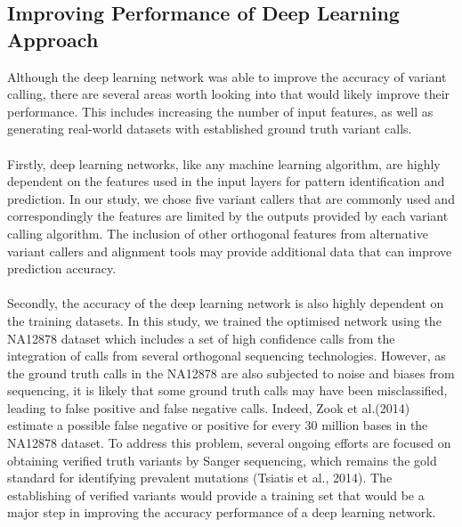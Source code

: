 \documentclass{article}
\begin{document}
\subsection{Improving Performance of Deep Learning Approach}

Although the deep learning network was able to improve the accuracy of variant calling, there are several areas worth looking into that would likely improve their performance. This includes increasing the number of input features, as well as generating real-world datasets with established ground truth variant calls.\\\\
Firstly, deep learning networks, like any machine learning algorithm, are highly dependent on the features used in the input layers for pattern identification and prediction. In our study, we chose five variant callers that are commonly used and correspondingly the features are limited by the outputs provided by each variant calling algorithm. The inclusion of other orthogonal features from alternative variant callers and alignment tools may provide additional data that can improve prediction accuracy.\\\\
Secondly, the accuracy of the deep learning network is also highly dependent on the training datasets. In this study, we trained the optimised network using the NA12878 dataset which includes a set of high confidence calls from the integration of calls from several orthogonal sequencing technologies. However, as the ground truth calls in the NA12878 are also subjected to noise and biases from sequencing, it is likely that some ground truth calls may have been misclassified, leading to false positive and false negative calls. Indeed, Zook et al.(2014) estimate a possible false negative or positive for every 30 million bases in the NA12878 dataset. To address this problem, several ongoing efforts are focused on obtaining verified truth variants by Sanger sequencing, which remains the gold standard for identifying prevalent mutations (Tsiatis et al., 2014). The establishing of verified variants would provide a training set that would be a major step in improving the accuracy performance of a deep learning network.
\end{document}
